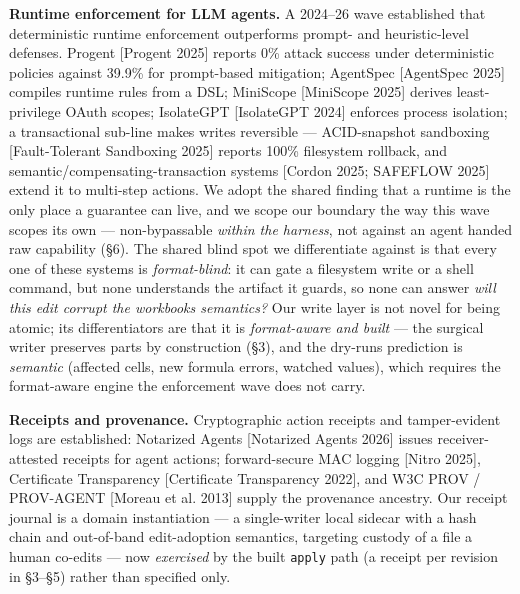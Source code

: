 \documentclass[
]{article}
\newcounter{none} %
\begin{document}
\textbf{Runtime enforcement for LLM agents.} A 2024--26 wave established
that deterministic runtime enforcement outperforms prompt- and
heuristic-level defenses. Progent {[}Progent 2025{]} reports 0\% attack
success under deterministic policies against 39.9\% for prompt-based
mitigation; AgentSpec {[}AgentSpec 2025{]} compiles runtime rules from a
DSL; MiniScope {[}MiniScope 2025{]} derives least-privilege OAuth
scopes; IsolateGPT {[}IsolateGPT 2024{]} enforces process isolation; a
transactional sub-line makes writes reversible --- ACID-snapshot
sandboxing {[}Fault-Tolerant Sandboxing 2025{]} reports 100\% filesystem
rollback, and semantic/compensating-transaction systems {[}Cordon 2025;
SAFEFLOW 2025{]} extend it to multi-step actions. We adopt the shared
finding that a runtime is the only place a guarantee can live, and we
scope our boundary the way this wave scopes its own --- non-bypassable
\emph{within the harness}, not against an agent handed raw capability
(§6). The shared blind spot we differentiate against is that every one
of these systems is \emph{format-blind}: it can gate a filesystem write
or a shell command, but none understands the artifact it guards, so none
can answer \emph{will this edit corrupt the workbook\textquotesingle s
semantics?} Our write layer is not novel for being atomic; its
differentiators are that it is \emph{format-aware and built} --- the
surgical writer preserves parts by construction (§3), and the
dry-run\textquotesingle s prediction is \emph{semantic} (affected cells,
new formula errors, watched values), which requires the format-aware
engine the enforcement wave does not carry.

\textbf{Receipts and provenance.} Cryptographic action receipts and
tamper-evident logs are established: Notarized Agents {[}Notarized
Agents 2026{]} issues receiver-attested receipts for agent actions;
forward-secure MAC logging {[}Nitro 2025{]}, Certificate Transparency
{[}Certificate Transparency 2022{]}, and W3C PROV / PROV-AGENT {[}Moreau
et al. 2013{]} supply the provenance ancestry. Our receipt journal is a
domain instantiation --- a single-writer local sidecar with a hash chain
and out-of-band edit-adoption semantics, targeting custody of a file a
human co-edits --- now \emph{exercised} by the built \texttt{apply} path
(a receipt per revision in §3--§5) rather than specified only.
\end{document}
